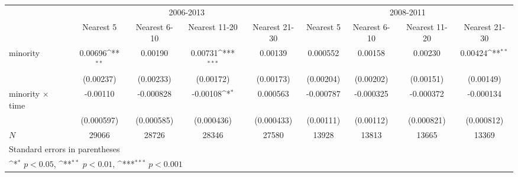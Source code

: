 {
\def\sym#1{\ifmmode^{#1}\else\(^{#1}\)\fi}
\begin{tabular}{l*{8}{c}}
\hline\hline
            &\multicolumn{4}{c}{2006-2013}                                                          &\multicolumn{4}{c}{2008-2011}                                                          \\\cmidrule(lr){2-5}\cmidrule(lr){6-9}
            &\multicolumn{1}{c}{Nearest 5}&\multicolumn{1}{c}{Nearest 6-10}&\multicolumn{1}{c}{Nearest 11-20}&\multicolumn{1}{c}{Nearest 21-30}&\multicolumn{1}{c}{Nearest 5}&\multicolumn{1}{c}{Nearest 6-10}&\multicolumn{1}{c}{Nearest 11-20}&\multicolumn{1}{c}{Nearest 21-30}\\
\hline
minority    &     0.00696\sym{**} &     0.00190         &     0.00731\sym{***}&     0.00139         &    0.000552         &     0.00158         &     0.00230         &     0.00424\sym{**} \\
            &   (0.00237)         &   (0.00233)         &   (0.00172)         &   (0.00173)         &   (0.00204)         &   (0.00202)         &   (0.00151)         &   (0.00149)         \\
[1em]
minority $\times$ time&    -0.00110         &   -0.000828         &    -0.00108\sym{*}  &    0.000563         &   -0.000787         &   -0.000325         &   -0.000372         &   -0.000134         \\
            &  (0.000597)         &  (0.000585)         &  (0.000436)         &  (0.000433)         &   (0.00111)         &   (0.00112)         &  (0.000821)         &  (0.000812)         \\
\hline
\(N\)       &       29066         &       28726         &       28346         &       27580         &       13928         &       13813         &       13665         &       13369         \\
\hline\hline
\multicolumn{9}{l}{\footnotesize Standard errors in parentheses}\\
\multicolumn{9}{l}{\footnotesize \sym{*} \(p<0.05\), \sym{**} \(p<0.01\), \sym{***} \(p<0.001\)}\\
\end{tabular}
}

